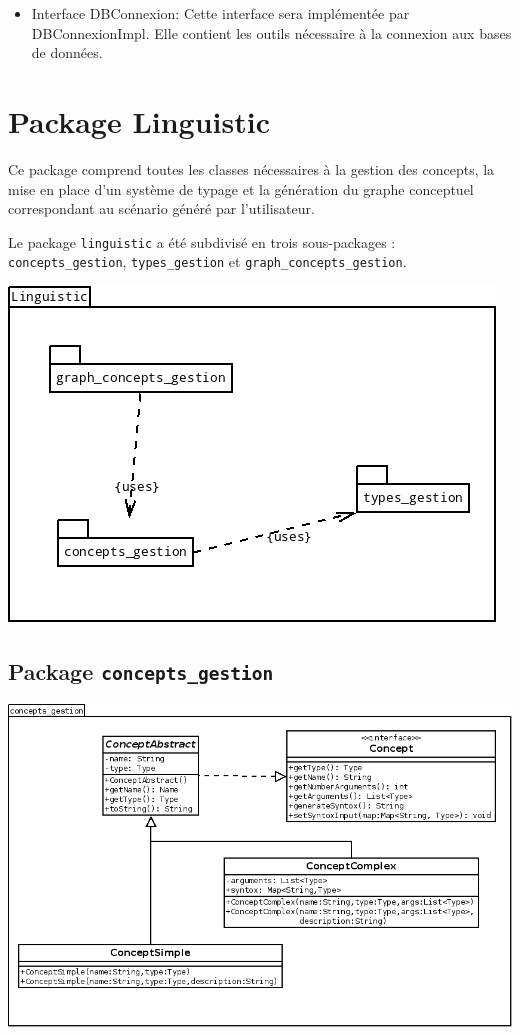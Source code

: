 \documentclass[12pt]{report}
\begin{document}
\begin{itemize}
\item Interface DBConnexion: Cette interface sera implémentée par DBConnexionImpl. Elle contient les outils nécessaire à la connexion aux bases de données.
\end{itemize}



\section{Package Linguistic}

Ce package comprend toutes les classes nécessaires à la gestion des concepts, la mise en place d'un système de typage et la génération du graphe conceptuel correspondant au scénario généré par l'utilisateur.

Le package \texttt{linguistic} a été subdivisé en trois sous-packages : \texttt{concepts\_gestion}, \texttt{types\_gestion} et \texttt{graph\_concepts\_gestion}.

\begin{center}
\includegraphics[scale=0.5]{DiagLinguisticPackages.png}
\end{center}

\subsection{Package \texttt{concepts\_gestion}}

\begin{center}
\includegraphics[scale=0.5]{DiagLinguistic_concepts_gestion.png}
\end{center}
\end{document}
